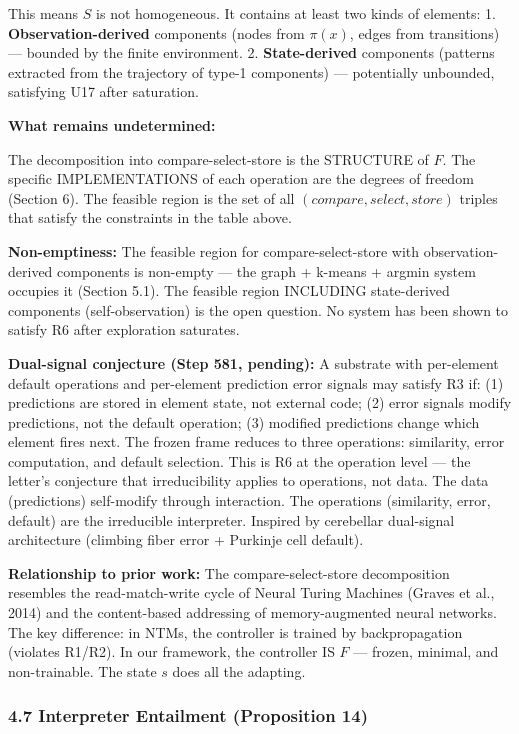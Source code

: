\documentclass[
  11pt,
]{article}
\begin{document}
This means \(S\) is not homogeneous. It contains at least two kinds of
elements: 1. \textbf{Observation-derived} components (nodes from
\(\pi(x)\), edges from transitions) --- bounded by the finite
environment. 2. \textbf{State-derived} components (patterns extracted
from the trajectory of type-1 components) --- potentially unbounded,
satisfying U17 after saturation.

\textbf{What remains undetermined:}

The decomposition into compare-select-store is the STRUCTURE of \(F\).
The specific IMPLEMENTATIONS of each operation are the degrees of
freedom (Section 6). The feasible region is the set of all
\((compare, select, store)\) triples that satisfy the constraints in the
table above.

\textbf{Non-emptiness:} The feasible region for compare-select-store
with observation-derived components is non-empty --- the graph + k-means
+ argmin system occupies it (Section 5.1). The feasible region INCLUDING
state-derived components (self-observation) is the open question. No
system has been shown to satisfy R6 after exploration saturates.

\textbf{Dual-signal conjecture (Step 581, pending):} A substrate with
per-element default operations and per-element prediction error signals
may satisfy R3 if: (1) predictions are stored in element state, not
external code; (2) error signals modify predictions, not the default
operation; (3) modified predictions change which element fires next. The
frozen frame reduces to three operations: similarity, error computation,
and default selection. This is R6 at the operation level --- the
letter's conjecture that irreducibility applies to operations, not data.
The data (predictions) self-modify through interaction. The operations
(similarity, error, default) are the irreducible interpreter. Inspired
by cerebellar dual-signal architecture (climbing fiber error + Purkinje
cell default).

\textbf{Relationship to prior work:} The compare-select-store
decomposition resembles the read-match-write cycle of Neural Turing
Machines (Graves et al., 2014) and the content-based addressing of
memory-augmented neural networks. The key difference: in NTMs, the
controller is trained by backpropagation (violates R1/R2). In our
framework, the controller IS \(F\) --- frozen, minimal, and
non-trainable. The state \(s\) does all the adapting.

\subsubsection{4.7 Interpreter Entailment (Proposition
14)}\label{interpreter-entailment-proposition-14}
\end{document}
